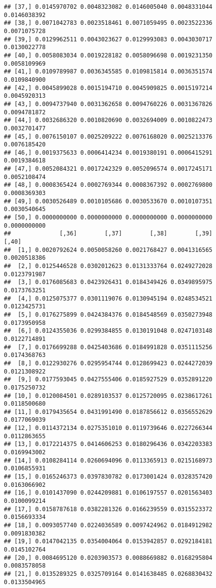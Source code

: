 \documentclass[]{article}
\begin{document}
\begin{verbatim}
## [37,] 0.0145970702 0.0048323082 0.0146005040 0.0048331044 0.0146038392
## [38,] 0.0071042783 0.0023518461 0.0071059495 0.0023522336 0.0071075728
## [39,] 0.0129962511 0.0043023627 0.0129993083 0.0043030717 0.0130022778
## [40,] 0.0058083034 0.0019228182 0.0058096698 0.0019231350 0.0058109969
## [41,] 0.0109789987 0.0036345585 0.0109815814 0.0036351574 0.0109840900
## [42,] 0.0045899028 0.0015194710 0.0045909825 0.0015197214 0.0045920313
## [43,] 0.0094737940 0.0031362658 0.0094760226 0.0031367826 0.0094781872
## [44,] 0.0032686320 0.0010820690 0.0032694009 0.0010822473 0.0032701477
## [45,] 0.0076150107 0.0025209222 0.0076168020 0.0025213376 0.0076185420
## [46,] 0.0019375633 0.0006414234 0.0019380191 0.0006415291 0.0019384618
## [47,] 0.0052084321 0.0017242329 0.0052096574 0.0017245171 0.0052108474
## [48,] 0.0008365424 0.0002769344 0.0008367392 0.0002769800 0.0008369303
## [49,] 0.0030526489 0.0010105686 0.0030533670 0.0010107351 0.0030540645
## [50,] 0.0000000000 0.0000000000 0.0000000000 0.0000000000 0.0000000000
##              [,36]        [,37]        [,38]        [,39]        [,40]
##  [1,] 0.0020792624 0.0050058260 0.0021768427 0.0041316565 0.0020518386
##  [2,] 0.0125446528 0.0302012623 0.0131333764 0.0249272028 0.0123791987
##  [3,] 0.0176085683 0.0423926431 0.0184349426 0.0349895975 0.0173763251
##  [4,] 0.0125075377 0.0301119076 0.0130945194 0.0248534521 0.0123425731
##  [5,] 0.0176275899 0.0424384376 0.0184548569 0.0350273948 0.0173950958
##  [6,] 0.0124355036 0.0299384855 0.0130191048 0.0247103148 0.0122714891
##  [7,] 0.0176699288 0.0425403686 0.0184991828 0.0351115256 0.0174368763
##  [8,] 0.0122930276 0.0295954744 0.0128699423 0.0244272039 0.0121308922
##  [9,] 0.0177593045 0.0427555406 0.0185927529 0.0352891220 0.0175250732
## [10,] 0.0120084501 0.0289103537 0.0125720095 0.0238617261 0.0118500680
## [11,] 0.0179435654 0.0431991490 0.0187856612 0.0356552629 0.0177069039
## [12,] 0.0114372134 0.0275351010 0.0119739646 0.0227266344 0.0112863655
## [13,] 0.0172214375 0.0414606253 0.0180296436 0.0342203383 0.0169943002
## [14,] 0.0108284114 0.0260694096 0.0113365913 0.0215168973 0.0106855931
## [15,] 0.0165246373 0.0397830782 0.0173001424 0.0328357420 0.0163066902
## [16,] 0.0101437090 0.0244209881 0.0106197557 0.0201563403 0.0100099214
## [17,] 0.0158787618 0.0382281326 0.0166239559 0.0315523372 0.0156693334
## [18,] 0.0093057740 0.0224036589 0.0097424962 0.0184912982 0.0091830382
## [19,] 0.0147042135 0.0354004064 0.0153942857 0.0292184181 0.0145102764
## [20,] 0.0084695120 0.0203903573 0.0088669882 0.0168295804 0.0083578058
## [21,] 0.0135289325 0.0325709164 0.0141638485 0.0268830432 0.0133504965

\end{verbatim}
\end{document}
